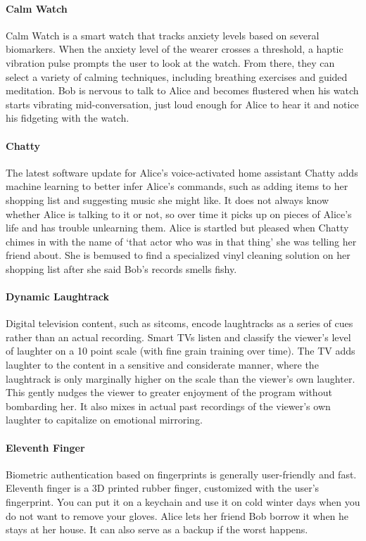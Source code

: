\paragraph{Calm Watch}
Calm Watch is a smart watch that tracks anxiety levels based on several biomarkers. When the anxiety level of the wearer crosses a threshold, a haptic vibration pulse prompts the user to look at the watch. From there, they can select a variety of calming techniques, including breathing exercises and guided meditation. Bob is nervous to talk to Alice and becomes flustered when his watch starts vibrating mid-conversation, just loud enough for Alice to hear it and notice his fidgeting with the watch.

\paragraph{Chatty}
The latest software update for Alice's voice-activated home assistant Chatty adds machine learning to better infer Alice's commands, such as adding items to her shopping list and suggesting music she might like. It does not always know whether Alice is talking to it or not, so over time it picks up on pieces of Alice's life and has trouble unlearning them. Alice is startled but pleased when Chatty chimes in with the name of `that actor who was in that thing' she was telling her friend about. She is bemused to find a specialized vinyl cleaning solution on her shopping list after she said Bob's records smells fishy.

\paragraph{ Dynamic Laughtrack}
Digital television content, such as sitcoms, encode laughtracks as a series of cues rather than an actual recording. Smart TVs listen and classify the viewer's level of laughter on a 10 point scale (with fine grain training over time). The TV adds laughter to the content in a sensitive and considerate manner, where the laughtrack is only marginally higher on the scale than the viewer's own laughter. This gently nudges the viewer to greater enjoyment of the program without bombarding her. It also mixes in actual past recordings of the viewer's own laughter to capitalize on emotional mirroring.

\paragraph{Eleventh Finger}
Biometric authentication based on fingerprints is generally user-friendly and fast. Eleventh finger is a 3D printed rubber finger, customized with the user's fingerprint. You can put it on a keychain and use it on cold winter days when you do not want to remove your gloves. Alice lets her friend Bob borrow it when he stays at her house. It can also serve as a backup if the worst happens.

